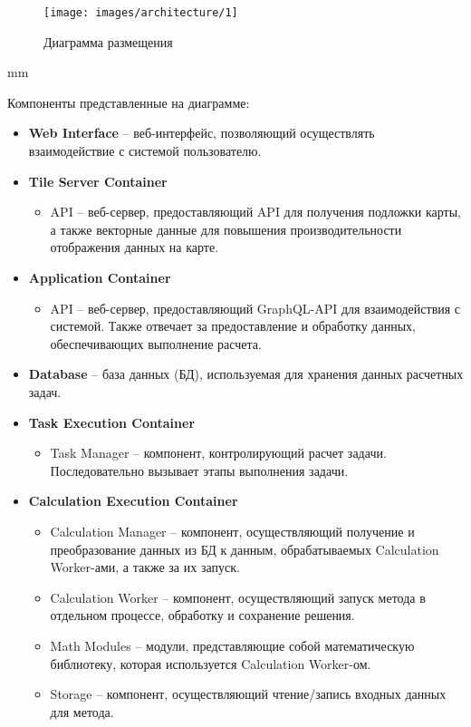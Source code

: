 \begin{figure}[H]
	\hspace*{-2.5 cm}\texttt{[image: images/architecture/1]}
	\caption{Диаграмма размещения}
	\label{pic:architecture__deployment-diagram}
\end{figure}
 mm

\noindent Компоненты представленные на диаграмме:
\begin{itemize}
	\item \textbf{Web Interface} -- веб-интерфейс, позволяющий осуществлять взаимодействие с системой пользователю.
	\item \textbf{Tile Server Container}
	\begin{itemize}
		\item API -- веб-сервер, предоставляющий API для получения подложки карты, а также векторные данные для
		повышения производительности отображения данных на карте.
	\end{itemize}
	\item \textbf{Application Container}
	\begin{itemize}
		\item API -- веб-сервер, предоставляющий GraphQL-API для взаимодействия с системой.
		Также отвечает за предоставление и обработку данных, обеспечивающих выполнение расчета.
	\end{itemize}
	\item \textbf{Database} -- база данных (БД), используемая для хранения данных расчетных задач.
	\item {\bf Task Execution Container}
	\begin{itemize}
		\item Task Manager -- компонент, контролирующий расчет задачи. Последовательно вызывает этапы выполнения задачи.
	\end{itemize}
	\item {\bf Calculation Execution Container}
	\begin{itemize}
		\item Calculation Manager -- компонент, осуществляющий получение и преобразование данных из БД к данным,
		обрабатываемых Calculation Worker-ами, а также за их запуск.
		\item Calculation Worker -- компонент, осуществляющий запуск метода в отдельном процессе, обработку и сохранение решения.
		\item Math Modules -- модули, представляющие собой математическую библиотеку, которая используется Calculation Worker-ом.
		\item Storage -- компонент, осуществляющий чтение/запись входных данных для метода.
	\end{itemize}
\end{itemize}


